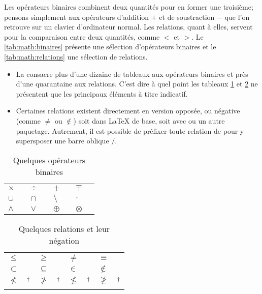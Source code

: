 Les opérateurs binaires combinent deux quantités pour en former une
troisième; pensons simplement aux opérateurs d'addition $+$ et de
soustraction $-$ que l'on retrouve sur un clavier d'ordinateur normal.
Les relations, quant à elles, servent pour la comparaison entre deux
quantités, comme $<$ et $>$. Le \autoref{tab:math:binaires}
présente une sélection d'opérateurs binaires et
le \autoref{tab:math:relations}  une sélection de relations.

\begin{itemize}
\item La %
  consacre plus d'une dizaine de tableaux aux opérateurs binaires et
  près d'une quarantaine aux relations. C'est dire à quel point les
  tableaux \ref{tab:math:binaires} et \ref{tab:math:relations} ne
  présentent que les principaux éléments à titre indicatif.
\item Certaines relations existent directement en version opposée, ou
  négative (comme $\neq$ ou $\notin$) soit dans {\LaTeX} de base, soit
  avec  ou un autre paquetage. Autrement, il est possible
  de préfixer toute relation de \cmd{\not} pour y supersposer une
  barre oblique $/$.
\end{itemize}

\begin{table}
  \caption{Quelques opérateurs binaires}
  \label{tab:math:binaires}
  \begin{tabularx}{1.0\linewidth}{lXlXlXlX}
    $\times$    & \cmd{\times} &
    $\div$      & \cmd{\div}   &
    $\pm$       & \cmd{\pm}    &
    $\mp$       & \cmd{\mp}    \\
    $\cup$      & \cmd{\cup} &
    $\cap$      & \cmd{\cap} &
    $\setminus$ & \cmd{\setminus} &
    $\cdot$     & \cmd{\cdot}  \\
    $\wedge$    & \cmd{\wedge} &
    $\vee$      & \cmd{\vee} &
    $\oplus$    & \cmd{\oplus} &
    $\otimes$   & \cmd{\otimes}
  \end{tabularx}
\end{table}

\begin{table}
  \caption{Quelques relations et leur négation}
  \label{tab:math:relations}
  \begin{tabularx}{1.0\linewidth}{lXlXlXlX}
    $\leq$      & \cmd{\leq} &
    $\geq$      & \cmd{\geq}   &
    $\neq$      & \cmd{\neq}    &
    $\equiv$    & \cmd{\equiv}    \\
    $\subset$   & \cmd{\subset} &
    $\subseteq$ & \cmd{\subseteq}  &
    $\in$       & \cmd{\in} &
    $\notin$    & \cmd{\notin} \\
    $\nless$    & \cmd{\nless}$^\dagger$ &
    $\ngtr$     & \cmd{\ngtr}$^\dagger$   &
    $\nleq$     & \cmd{\nleq}$^\dagger$    &
    $\ngeq$     & \cmd{\ngeq}$^\dagger$ \\
    \addlinespace
  \end{tabularx}
\end{table}

